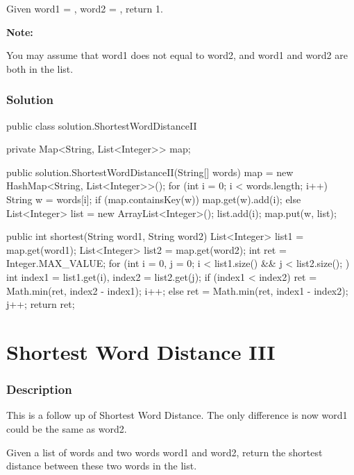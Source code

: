 Given word1 = , word2 = , return 1.

\textbf{Note:}

You may assume that word1 does not equal to word2, and word1 and word2 are both in the list.

\subsubsection{Solution}

\begin{Code}
public class solution.ShortestWordDistanceII {

    private Map<String, List<Integer>> map;

    public solution.ShortestWordDistanceII(String[] words) {
        map = new HashMap<String, List<Integer>>();
        for (int i = 0; i < words.length; i++) {
            String w = words[i];
            if (map.containsKey(w)) {
                map.get(w).add(i);
            } else {
                List<Integer> list = new ArrayList<Integer>();
                list.add(i);
                map.put(w, list);
            }
        }
    }

    public int shortest(String word1, String word2) {
        List<Integer> list1 = map.get(word1);
        List<Integer> list2 = map.get(word2);
        int ret = Integer.MAX_VALUE;
        for (int i = 0, j = 0; i < list1.size() && j < list2.size(); ) {
            int index1 = list1.get(i), index2 = list2.get(j);
            if (index1 < index2) {
                ret = Math.min(ret, index2 - index1);
                i++;
            } else {
                ret = Math.min(ret, index1 - index2);
                j++;
            }
        }
        return ret;
    }
}
\end{Code}

\newpage

\section{ Shortest Word Distance III} %

\subsubsection{Description}
This is a follow up of Shortest Word Distance. The only difference is now word1 could be the same as word2.

Given a list of words and two words word1 and word2, return the shortest distance between these two words in the list.

